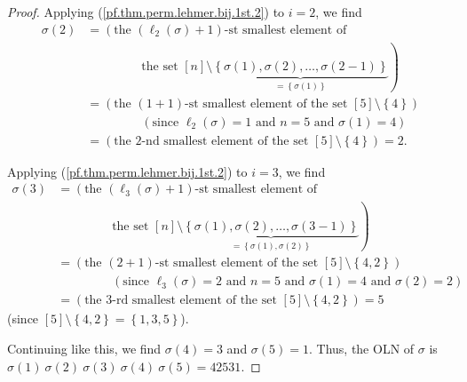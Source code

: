 \begin{proof}
Applying (\ref{pf.thm.perm.lehmer.bij.1st.2}) to $i=2$, we find%
\begin{align*}
\sigma\left(  2\right)   &  =\left(  \text{the }\left(  \ell_{2}\left(
\sigma\right)  +1\right)  \text{-st smallest element of}\right. \\
&  \ \ \ \ \ \ \ \ \ \ \ \ \ \ \ \ \ \ \ \ \left.  \text{the set }\left[
n\right]  \setminus\underbrace{\left\{  \sigma\left(  1\right)  ,\sigma\left(
2\right)  ,\ldots,\sigma\left(  2-1\right)  \right\}  }_{=\left\{
\sigma\left(  1\right)  \right\}  }\right) \\
&  =\left(  \text{the }\left(  1+1\right)  \text{-st smallest element of the
set }\left[  5\right]  \setminus\left\{  4\right\}  \right) \\
&  \ \ \ \ \ \ \ \ \ \ \ \ \ \ \ \ \ \ \ \ \left(  \text{since }\ell
_{2}\left(  \sigma\right)  =1\text{ and }n=5\text{ and }\sigma\left(
1\right)  =4\right) \\
&  =\left(  \text{the }2\text{-nd smallest element of the set }\left[
5\right]  \setminus\left\{  4\right\}  \right)  =2.
\end{align*}


Applying (\ref{pf.thm.perm.lehmer.bij.1st.2}) to $i=3$, we find%
\begin{align*}
\sigma\left(  3\right)   &  =\left(  \text{the }\left(  \ell_{3}\left(
\sigma\right)  +1\right)  \text{-st smallest element of}\right. \\
&  \ \ \ \ \ \ \ \ \ \ \ \ \ \ \ \ \ \ \ \ \left.  \text{the set }\left[
n\right]  \setminus\underbrace{\left\{  \sigma\left(  1\right)  ,\sigma\left(
2\right)  ,\ldots,\sigma\left(  3-1\right)  \right\}  }_{=\left\{
\sigma\left(  1\right)  ,\sigma\left(  2\right)  \right\}  }\right) \\
&  =\left(  \text{the }\left(  2+1\right)  \text{-st smallest element of the
set }\left[  5\right]  \setminus\left\{  4,2\right\}  \right) \\
&  \ \ \ \ \ \ \ \ \ \ \ \ \ \ \ \ \ \ \ \ \left(  \text{since }\ell
_{3}\left(  \sigma\right)  =2\text{ and }n=5\text{ and }\sigma\left(
1\right)  =4\text{ and }\sigma\left(  2\right)  =2\right) \\
&  =\left(  \text{the }3\text{-rd smallest element of the set }\left[
5\right]  \setminus\left\{  4,2\right\}  \right)  =5
\end{align*}
(since $\left[  5\right]  \setminus\left\{  4,2\right\}  =\left\{
1,3,5\right\}  $).

Continuing like this, we find $\sigma\left(  4\right)  =3$ and $\sigma\left(
5\right)  =1$. Thus, the OLN of $\sigma$ is $\sigma\left(  1\right)
\ \sigma\left(  2\right)  \ \sigma\left(  3\right)  \ \sigma\left(  4\right)
\ \sigma\left(  5\right)  =42531$.


\end{proof}
